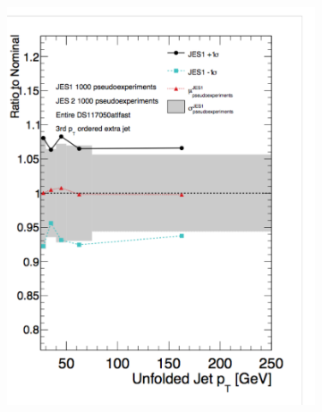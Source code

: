 \begin{figure}
\begin{subfigure}[]{0.45\textwidth}
\includegraphics[width=\textwidth]{fig/UnfoldSys/JESJet2.pdf}
\end{subfigure}
\begin{subfigure}[]{0.45\textwidth}

\end{subfigure}
\end{figure}
